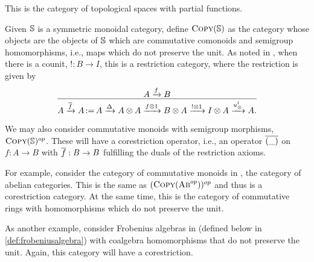 \begin{example}[\topcatp]\label{ex:restriction_category_top}
  This is the category of topological spaces with partial functions.
\end{example}

\begin{example}\label{ex:algebras-not-preserving-unit-as-restriction-cat}
  Given $\mathbb{S}$ is a symmetric monoidal category, define $\textsc{Copy}(\mathbb{S})$ as the category whose objects are
  the objects of $\mathbb{S}$ which are commutative comonoids and semigroup homomorphisms, i.e., maps which
  do not preserve the unit. As noted in \cite{cockett2002:restcategories1}, when there is a counit,
  $!:B\to I$, this is a restriction category, where the restriction is given by
  \[
    \infer{A\xrightarrow{\rst{f}}A \definedas A \xrightarrow{\Delta} A\*A \xrightarrow{f\*1} B\* A
      \xrightarrow{!\*1} I\*A \xrightarrow{\usl} A.}{A\xrightarrow{f}B}
  \]

  We may also consider commutative monoids with semigroup morphisms,
  $\textsc{Copy}(\mathbb{S})^{op}$. These will have a corestriction operator, i.e., an operator
  $\overline{(\_)}$ on $f:A\to B$ with $\overline{f}:B\to B$ fulfilling the duals of the restriction axioms.


  For example, consider the category of commutative monoids in \Ab, the category of abelian
  categories. This is the same as $(\textsc{Copy}(\textsc{Ab}^{op}))^{op}$ and thus is a corestriction
  category. At the same time, this is the category of commutative rings with homomorphisms which do
  not preserve the unit.

  As another example, consider Frobenius algebras in \cS (defined below in
  \ref{def:frobeniusalgebra}) with coalgebra homomorphisms that do not preserve the unit. Again,
  this category will have a corestriction.
\end{example}

